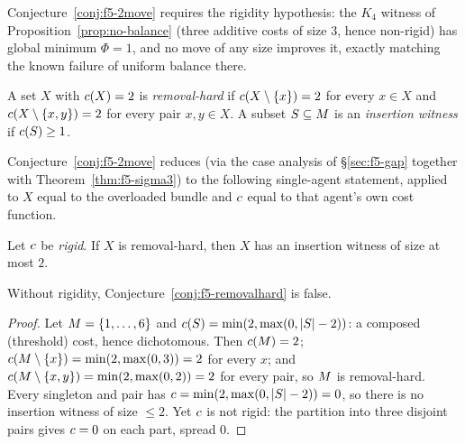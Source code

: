 Conjecture~\ref{conj:f5-2move} requires the rigidity hypothesis: the $K_4$
witness of Proposition~\ref{prop:no-balance} (three additive costs of size
$3$, hence non-rigid) has global minimum $\Phi = 1$, and no move of any size
improves it, exactly matching the known failure of uniform balance there.

\begin{definition}
A set $X$ with $c(X) = 2$ is \emph{removal-hard} if
$c(X \setminus \left\{x\right\}) = 2$ for every $x \in X$ and
$c(X \setminus \left\{x,y\right\}) = 2$ for every pair $x,y \in X$. A subset
$S \subseteq M$ is an \emph{insertion witness} if $c(S) \ge 1$.
\end{definition}

Conjecture~\ref{conj:f5-2move} reduces (via the case analysis of
\S\ref{sec:f5-gap} together with Theorem~\ref{thm:f5-sigma3}) to the following
single-agent statement, applied to $X$ equal to the overloaded bundle and
$c$ equal to that agent's own cost function.

\begin{conjecture}
\label{conj:f5-removalhard}
Let $c$ be \emph{rigid}. If $X$ is removal-hard, then $X$ has an insertion
witness of size at most $2$.
\end{conjecture}

\begin{proposition}
\label{prop:f5-removalhard-needsrigid}
Without rigidity, Conjecture~\ref{conj:f5-removalhard} is false.
\end{proposition}

\begin{proof}
Let $M = \left\{1,\dots,6\right\}$ and $c(S) = \min(2, \max(0, \left\lvert S\right\rvert - 2))$: a
composed (threshold) cost, hence dichotomous. Then $c(M) = 2$;
$c(M \setminus \left\{x\right\}) = \min(2,\max(0,3)) = 2$ for every $x$; and
$c(M \setminus \left\{x,y\right\}) = \min(2,\max(0,2)) = 2$ for every pair, so
$M$ is removal-hard. Every singleton and pair has $c = \min(2,\max(0,
\left\lvert S\right\rvert - 2)) = 0$, so there is no insertion witness of size $\le 2$. Yet
$c$ is not rigid: the partition into three disjoint pairs gives
$c = 0$ on each part, spread $0$.
\end{proof}

